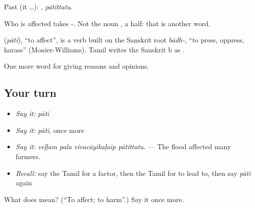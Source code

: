 Past (it …): , \emph{pātittatu}.

Who is affected takes -. Not the noun , a half: that is another word.

\begin{cousinweb}
\textbf{} (\emph{pāti}), \textquotedblleft{}to affect\textquotedblright{}, is a verb built on the Sanskrit root \emph{bādh-}, \textquotedblleft{}to press, oppress, harass\textquotedblright{} (Monier-Williams). Tamil writes the Sanskrit b as .
\end{cousinweb}

\begin{grammarlens}[title={What you've built}]
One more word for giving reasons and opinions.
\end{grammarlens}

\subsection*{Your turn}
\begin{itemize}
\raggedright
  \item \emph{Say it:} \emph{pāti}
  \item \emph{Say it:} \emph{pāti}, once more
  \item \emph{Say it:} \emph{veḷḷam pala vivacāyikaḷaip pātittatu.} — The flood affected many farmers.
  \item \emph{Recall:} say the Tamil for a factor, then the Tamil for to lead to, then say \emph{pāti} again
\end{itemize}

\begin{tcolorbox}[breakable,colback=teal!4,colframe=teal!35!black,title={Before you move on}]
What does  mean? (\textquotedblleft{}To affect; to harm\textquotedblright{}.) Say it once more.
\end{tcolorbox}
